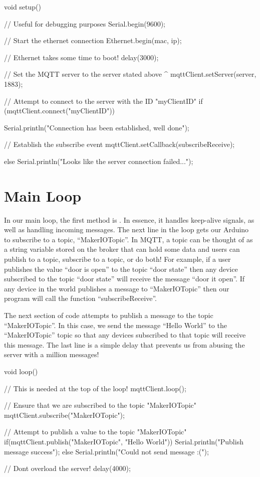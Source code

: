 \begin{Arduino}
void setup()
{
	// Useful for debugging purposes
	Serial.begin(9600);
		
	// Start the ethernet connection
	Ethernet.begin(mac, ip);              
		
	// Ethernet takes some time to boot!
	delay(3000);                          
		
	// Set the MQTT server to the server stated above ^
	mqttClient.setServer(server, 1883);   
		
	// Attempt to connect to the server with the ID "myClientID"
	if (mqttClient.connect("myClientID")) 
	{
		Serial.println("Connection has been established, well done");
			
		// Establish the subscribe event
		mqttClient.setCallback(subscribeReceive);
	} 
	else 
	{
		Serial.println("Looks like the server connection failed...");
	}
}
\end{Arduino}

\section{Main Loop}

In our main loop, the first method is . In essence, it handles keep-alive signals, as well as handling incoming messages. The next line in the loop gets our Arduino to subscribe to a topic, ``MakerIOTopic''. In MQTT, a topic can be thought of as a string variable stored on the broker that can hold some data and users can publish to a topic, subscribe to a topic, or do both! For example, if a user publishes the value ``door is open'' to the topic ``door state'' then any device subscribed to the topic ``door state'' will receive the message ``door it open''. If any device in the world publishes a message to ``MakerIOTopic'' then our program will call the function ``subscribeReceive''.

The next section of code attempts to publish a message to the topic ``MakerIOTopic''. In this case, we send the message ``Hello World'' to the ``MakerIOTopic'' topic so that any devices subscribed to that topic will receive this message. The last line is a simple delay that prevents us from abusing the server with a million messages!

\bigskip

\begin{Arduino}
void loop()
{
	// This is needed at the top of the loop!
	mqttClient.loop();
		
	// Ensure that we are subscribed to the topic "MakerIOTopic"
	mqttClient.subscribe("MakerIOTopic");
		
	// Attempt to publish a value to the topic "MakerIOTopic"
	if(mqttClient.publish("MakerIOTopic", "Hello World"))
	{
		Serial.println("Publish message success");
	}
	else
	{
		Serial.println("Could not send message :(");
	}
		
	// Dont overload the server!
	delay(4000);
}
\end{Arduino}

